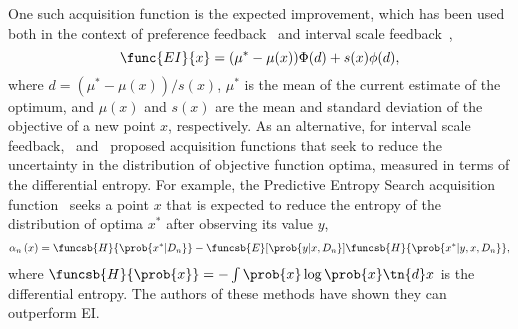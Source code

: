 One such acquisition function is the expected improvement, which has been used
both in the context of preference feedback~\citep{eric2008active} and interval
scale feedback~\citep{jones1998efficient},
\begin{equation}
    \func{EI}{x} = (\mu^* - \mu(x))\Phi(d) + s(x)\phi(d),
    \label{eq:expected_improvement}
\end{equation}
where $d = (\mu^* - \mu(x))/s(x)$, $\mu^*$ is the mean of the current estimate
of the optimum, and $\mu(x)$ and $s(x)$ are the mean and standard deviation of
the objective of a new point $x$, respectively. As an alternative, for interval
scale feedback,~\citep{hennig2012entropy} and~\citep{hernandez2014predictive}
proposed acquisition functions that seek to reduce the uncertainty in the
distribution of objective function optima, measured in terms of the differential
entropy. For example, the Predictive Entropy Search acquisition
function~\citep{hernandez2014predictive} seeks a point $x$ that is expected to
reduce the entropy of the distribution of optima $x^*$ after observing its value
$y$,
\begin{align}
    \alpha_n \left(x \right) = \funcsb{H}{\prob{x^*|D_n}} 
        - \funcsb{E}[\prob{y|x, D_n}]{\funcsb{H}{\prob{x^*|y, x, D_n}}},
    \label{eq:pes_interval_scale}
\end{align}
where $\funcsb{H}{\prob{x}} = - \int \prob{x} \log \prob{x} \tn{d} x$
is the differential entropy. The authors of these methods have shown they can
outperform EI\@. 
